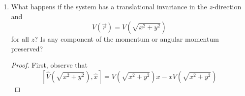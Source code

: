 \documentclass[../psets.tex]{subfiles}
\begin{document}
\begin{enumerate}
\begin{enumerate}
\begin{proof}
\begin{align*}
                &= \frac{1}{2m}(\hat{p}_y(-i\hbar\hat{p}_z)+(-i\hbar\hat{p}_z)\hat{p}_y)\\
                &= -\frac{i\hbar}{2m}(\hat{p}_y\hat{p}_z+\hat{p}_z\hat{p}_y)\\
                &= -\frac{i\hbar}{2m}(\hat{p}_y\hat{p}_z+\hat{p}_y\hat{p}_z)\\
                &= -\frac{i\hbar\hat{p}_y\hat{p}_z}{m}
            \end{align*}
            Note that $\hat{p}_z\hat{p}_y=\hat{p}_y\hat{p}_z$ because $[\hat{p}_y,\hat{p}_z]=0$.\par
            Example evaluation:
            \begin{align*}
                [\hat{V}(r),\hat{y}\hat{p}_z] &= \hat{y}\underbrace{[\hat{V}(r),\hat{p}_z]}_{i\hbar\pdv*{V}{z}}+\underbrace{[\hat{V}(r),\hat{y}]}_0\hat{p}_z\\
                &= i\hbar\hat{y}\pdv{V}{z}
            \end{align*}
            Returning to the original set of equations, from line 3 to line 4, we evaluated the last two commutators and applied the chain rule. From line 4 to line 5, we algebraically expanded and cancelled everything (using $r=\sqrt{x^2+y^2+z^2}$ for the partial derivatives).\par
            Moving on, similar to the above, we obtain that
            \begin{equation*}
                [\hat{H},\hat{L}_y] = [\hat{H},\hat{L}_z] = 0
            \end{equation*}
            Thus, by bilinearity once more,
            \begin{equation*}
                [\hat{H},\hat{\vec{L}}] = [\hat{H},\hat{L}_x+\hat{L}_y+\hat{L}_z] = 0
            \end{equation*}
        \end{proof}
        \item What happens if the system has a translational invariance in the $z$-direction and
        \begin{equation}
            V(\vec{r}) = V(\sqrt{x^2+y^2})
        \end{equation}
        for all $z$? Is any component of the momentum or angular momentum preserved?
        \begin{proof}
            First, observe that
            \begin{equation*}
                \left[ \hat{V}(\sqrt{x^2+y^2}),\hat{x} \right] = V(\sqrt{x^2+y^2})x-xV(\sqrt{x^2+y^2})

\end{equation*}
\end{proof}
\end{enumerate}
\end{enumerate}
\end{document}
